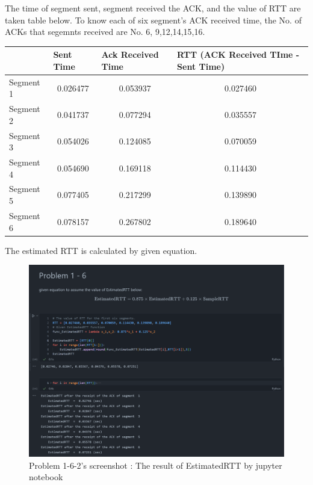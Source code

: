 \begin{enumerate}[label=\bfseries Problem \arabic*:,leftmargin=*,labelindent=1em]
        The time of segment sent, segment received the ACK, and the value of RTT are taken table below. To know each of six segment’s ACK received time, the No. of  ACKs that segemnts received are  No. 6, 9,12,14,15,16.
        \begin{table}[!h]\centering
        \hspace{10mm}
        \begin{tabular}{|l|c|c|c|}
        \hline
         & \multicolumn{1}{l|}{Sent Time} & \multicolumn{1}{l|}{Ack Received Time} & \multicolumn{1}{l|}{RTT (ACK Received TIme - Sent Time)} \\ \hline
        Segment 1 & 0.026477 & 0.053937 & 0.027460 \\ \hline
        Segment 2 & 0.041737 & 0.077294 & 0.035557 \\ \hline
        Segment 3 & 0.054026 & 0.124085 & 0.070059 \\ \hline
        Segment 4 & 0.054690 & 0.169118 & 0.114430 \\ \hline
        Segment 5 & 0.077405 & 0.217299 & 0.139890 \\ \hline
        Segment 6 & 0.078157 & 0.267802 & 0.189640 \\ \hline
        \end{tabular}
        \end{table}
\clearpage
        The estimated RTT is calculated by given equation.\\
        \vspace{-4mm}  
        \begin{figure}[!h]\raggedleft
        \hspace{15mm}
    		\includegraphics[width=.9\textwidth]{image/week02/1-6-3.png}
    		\caption{\footnotesize Problem 1-6-2's screenshot : The result of EstimatedRTT by jupyter notebook}
    		\vspace{-10pt}
        \end{figure}
        

\end{enumerate}
